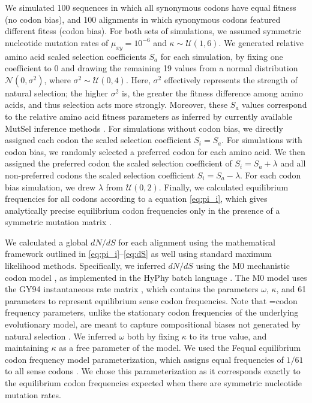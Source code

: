 \documentclass{pnastwo}
\begin{document}
\begin{article}
We simulated 100 sequences in which all synonymous codons have equal fitness (no codon bias), and 100 alignments in which synonymous codons featured different fitess (codon bias). For both sets of simulations, we assumed symmetric nucleotide mutation rates of $\mu_{xy} = 10^{-6}$ and $\kappa \sim \mathcal{U} (1,6)$. We generated relative amino acid scaled selection coefficients $S_a$ for each simulation, by fixing one coefficient to 0 and drawing the remaining 19 values from a normal distribution $\mathcal{N}(0,\sigma^2)$, where $\sigma^2 \sim \mathcal{U}(0,4)$. Here, $\sigma^2$ effectively represents the strength of natural selection; the higher $\sigma^2$ is, the greater the fitness difference among amino acids, and thus selection acts more strongly. Moreover, these $S_a$ values correspond to the relative amino acid fitness parameters as inferred by currently available MutSel inference methods \cite{RodrigueLartillot2014,Tamurietal2014}.
For simulations without codon bias, we directly assigned each codon the scaled selection coefficient $S_i = S_a$. For simulations with codon bias, we randomly selected a preferred codon for each amino acid. We then assigned the preferred codon the scaled selection coefficient of $S_i = S_a + \lambda$ and all non-preferred codons the scaled selection coefficient $S_i = S_a - \lambda$. For each codon bias simulation, we drew $\lambda$ from $\mathcal{U}(0,2)$. Finally, we calculated equilibrium frequencies for all codons according to a equation \eqref{eq:pi_i}, which gives analytically precise equilibrium codon frequencies only in the presence of a symmetric mutation matrix \cite{SellaHirsh2005}.

We calculated a global $dN/dS$ for each alignment using the mathematical framework outlined in \eqref{eq:pi_i}--\eqref{eq:dS} as well using standard maximum likelihood methods. Specifically, we inferred $dN/dS$ using the M0 mechanistic codon model \cite{Yangetal2000}, as implemented in the HyPhy batch language \cite{KosakovskyPondetal2005}. The M0 model uses the GY94 instantaneous rate matrix \cite{GoldmanYang1994,NielsenYang1998}, which contains the parameters $\omega$, $\kappa$, and 61 parameters to represent equilibrium sense codon frequencies. Note that =codon frequency parameters, unlike the stationary codon frequencies of the underlying evolutionary model, are meant to capture compositional biases not generated by natural selection \cite{GoldmanYang1994,MuseGaut1994,YN00,Yang2006}. We inferred $\omega$ both by fixing $\kappa$ to its true value, and maintaining $\kappa$ as a free parameter of the model. We used the Fequal equilibrium codon frequency model parameterization, which assigns equal frequencies of $1/61$ to all sense codons \cite{Yang2006}. We chose this parameterization as it corresponds exactly to the equilibrium codon frequencies expected when there are symmetric nucleotide mutation rates.



\end{article}
\end{document}
